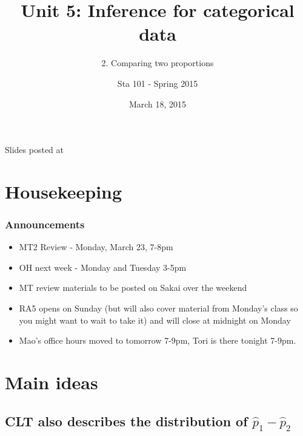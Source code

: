 \documentclass[slidestop,compress,mathserif,12pt,t,professionalfonts,xcolor=table]{beamer}
\title{Unit 5: Inference for categorical data}
\subtitle{2. Comparing two proportions}
\author{Sta 101 - Spring 2015}
\date{March 18, 2015}
\institute{Duke University, Department of Statistical Science}
\begin{document}


\begin{frame}[plain]

\titlepage
\vfill
{\scriptsize {} \hfill Slides posted at  \webLink{\CourseSite}{\CourseSite}}
\addtocounter{framenumber}{-1} 

\end{frame}


\section{Housekeeping}


\begin{frame}
\frametitle{Announcements}

\begin{itemize}

\item MT2 Review - Monday, March 23, 7-8pm

\item OH next week - Monday and Tuesday 3-5pm

\item MT review materials to be posted on Sakai over the weekend

\item RA5 opens on Sunday (but will also cover material from Monday's class so you might want to wait to take it) and will close at midnight on Monday

\item Mao's office hours moved to tomorrow 7-9pm, Tori is there tonight 7-9pm.

\end{itemize}

\end{frame}


\section{Main ideas}


\subsection{CLT also describes the distribution of $\hat{p}_1 - \hat{p}_2$}
\label{mi1}
\end{document}
